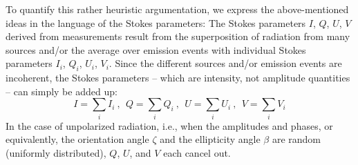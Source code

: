 To quantify this rather heuristic argumentation, we express the
above-mentioned ideas in the language of the Stokes parameters: The
Stokes parameters $I$, $Q$, $U$, $V$ derived from measurements result
from the superposition of radiation from many sources and/or the
average over emission events with individual Stokes parameters $I_i$,
$Q_i$, $U_i$, $V_i$.  Since the different sources and/or emission events are
incoherent, the Stokes parameters -- which are intensity, not
amplitude quantities -- can simply be added up:
\begin{equation}
  \label{eq:polarization:summed_stokes}
  I = \sum_i I_i \: \mbox{, }\; 
  Q = \sum_i Q_i \: \mbox{, }\; 
  U = \sum_i U_i \: \mbox{, }\; 
  V = \sum_i V_i
\end{equation}
In the case of unpolarized radiation, i.e., when the amplitudes and
phases, or equivalently, the orientation angle $\zeta$ and the
ellipticity angle $\beta$ are random (uniformly distributed), 
$Q$, $U$, and $V$
each cancel out.

